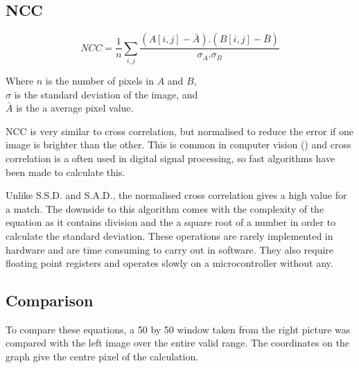 \subsection{NCC}
\begin{equation}\label{eq:NCC}
NCC =  \frac{1}{n}\sum\limits_{i,j} \frac{(A[i,j] - \bar{A}).(B[i,j] - \bar{B})}{\sigma _A . \sigma _B}
\end{equation}
\begin{center}
Where $n$ is the number of pixels in $A$ and $B$, \\$\sigma$ is the standard deviation of the image, and \\$\bar{A}$ is the a average pixel value. 
\end{center}
NCC is very similar to cross correlation, but normalised to reduce the error if one image is brighter than the other. This is common in computer vision (\cite{Tsai:NCC}) and cross correlation is a often used in digital signal processing, so fast algorithms have been made to calculate this. 

Unlike S.S.D. and S.A.D., the normalised cross correlation gives a high value for a match. The downside to this algorithm comes with the complexity of the equation as it contains division and the a square root of a number in order to calculate the standard deviation. These operations are rarely implemented in hardware and are time consuming to carry out in software. They also require floating point registers and operates slowly on a microcontroller without any. 



\subsection{Comparison}

To compare these equations, a 50 by 50 window taken from the right picture was compared with the left image over the entire valid range. The coordinates on the graph give the centre pixel of the calculation. 

